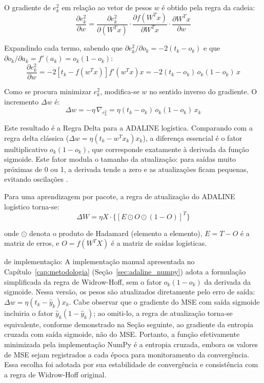 O gradiente de $e_k^2$ em relação ao vetor de pesos $w$ é obtido pela regra da cadeia:
\begin{equation}
\frac{\partial e_k^2}{\partial w} = \frac{\partial e_k^2}{\partial (W^T x)} \cdot \frac{\partial f(W^T x)}{\partial W^T x} \cdot \frac{\partial W^T x}{\partial w}
\end{equation}

Expandindo cada termo, sabendo que $\partial e_k^2 / \partial o_k = -2(t_k - o_k)$ e que $\partial o_k / \partial a_k = f'(a_k) = o_k(1 - o_k)$:
\begin{equation}
\frac{\partial e_k^2}{\partial w} = -2[t_k - f(w^T x)] f'(w^T x) x = -2(t_k - o_k) \, o_k (1 - o_k) \, x
\end{equation}

Como se procura minimizar $e_k^2$, modifica-se $w$ no sentido inverso do gradiente. O incremento $\Delta w$ é:
\begin{equation}
\Delta w = -\eta \, \nabla_{e_k^2} = \eta (t_k - o_k) \, o_k (1 - o_k) \, x_k
\end{equation}

Este resultado é a Regra Delta para a ADALINE logística. Comparando com a regra delta clássica ($\Delta w = \eta (t_k - w^T x_k) x_k$), a diferença essencial é o fator multiplicativo $o_k(1 - o_k)$, que corresponde exatamente à derivada da função sigmoide. Este fator modula o tamanho da atualização: para saídas muito próximas de 0 ou 1, a derivada tende a zero e as atualizações ficam pequenas, evitando oscilações \cite{silva2016}.

Para uma aprendizagem por pacote, a regra de atualização do ADALINE logístico torna-se:
\begin{equation}
\Delta W = \eta X \cdot \{[E \odot O \odot (1 - O)]^T\}
\end{equation}

onde $\odot$ denota o produto de Hadamard (elemento a elemento), $E = T - O$ é a matriz de erros, e $O = f(W^T X)$ é a matriz de saídas logísticas.

\medskip
\noindentNota de implementação: A implementação manual apresentada no Capítulo~\ref{cap:metodologia} (Seção~\ref{sec:adaline_numpy}) adota a formulação simplificada da regra de Widrow-Hoff, sem o fator $o_k(1-o_k)$ da derivada da sigmoide. Nessa versão, os pesos são atualizados diretamente pelo erro de saída: $\Delta w = \eta(t_k - \hat{y}_k)x_k$. Cabe observar que o gradiente do MSE com saída sigmoide incluiria o fator $\hat{y}_k(1-\hat{y}_k)$; ao omiti-lo, a regra de atualização torna-se equivalente, conforme demonstrado na Seção seguinte, ao gradiente da entropia cruzada com saída sigmoide, não do MSE. Portanto, a função efetivamente minimizada pela implementação NumPy é a entropia cruzada, embora os valores de MSE sejam registrados a cada época para monitoramento da convergência. Essa escolha foi adotada por sua estabilidade de convergência e consistência com a regra de Widrow-Hoff original.

